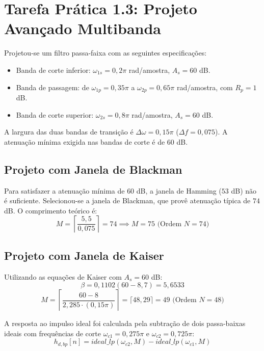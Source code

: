 \documentclass[10pt, conference]{IEEEtran}
\begin{document}
\section{Tarefa Prática 1.3: Projeto Avançado Multibanda}
Projetou-se um filtro passa-faixa com as seguintes especificações:
\begin{itemize}
    \item Banda de corte inferior: $\omega_{1s} = 0,2\pi$ rad/amostra, $A_s = 60$ dB.
    \item Banda de passagem: de $\omega_{1p} = 0,35\pi$ a $\omega_{2p} = 0,65\pi$ rad/amostra, com $R_p = 1$ dB.
    \item Banda de corte superior: $\omega_{2s} = 0,8\pi$ rad/amostra, $A_s = 60$ dB.
\end{itemize}

A largura das duas bandas de transição é $\Delta\omega = 0,15\pi$ ($\Delta f = 0,075$). A atenuação mínima exigida nas bandas de corte é de $60$ dB.

\subsection{Projeto com Janela de Blackman}
Para satisfazer a atenuação mínima de $60$ dB, a janela de Hamming ($53$ dB) não é suficiente. Selecionou-se a janela de Blackman, que provê atenuação típica de $74$ dB. O comprimento teórico é:
\begin{equation}
M = \left\lceil \frac{5,5}{0,075} \right\rceil = 74 \implies M = 75 \text{ (Ordem } N=74\text{)}
\end{equation}

\subsection{Projeto com Janela de Kaiser}
Utilizando as equações de Kaiser com $A_s = 60$ dB:
\begin{equation}
\beta = 0,1102(60 - 8,7) = 5,6533
\end{equation}
\begin{equation}
M = \left\lceil \frac{60 - 8}{2,285 \cdot (0,15\pi)} \right\rceil = \lceil 48,29 \rceil = 49 \text{ (Ordem } N=48\text{)}
\end{equation}

A resposta ao impulso ideal foi calculada pela subtração de dois passa-baixas ideais com frequências de corte $\omega_{c1} = 0,275\pi$ e $\omega_{c2} = 0,725\pi$:
\begin{equation}
h_{d,bp}[n] = ideal\_lp(\omega_{c2}, M) - ideal\_lp(\omega_{c1}, M)
\end{equation}
\end{document}
